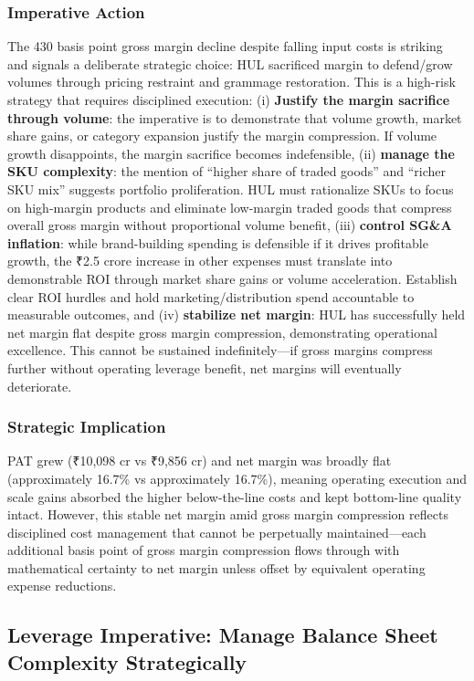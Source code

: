 \documentclass[12pt, a4paper]{report}
\begin{document}
\subsubsection{Imperative Action}
The 430 basis point gross margin decline despite falling input costs is striking and signals a deliberate strategic choice: HUL sacrificed margin to defend/grow volumes through pricing restraint and grammage restoration. This is a high-risk strategy that requires disciplined execution: (i) \textbf{Justify the margin sacrifice through volume}: the imperative is to demonstrate that volume growth, market share gains, or category expansion justify the margin compression. If volume growth disappoints, the margin sacrifice becomes indefensible, (ii) \textbf{manage the SKU complexity}: the mention of ``higher share of traded goods'' and ``richer SKU mix'' suggests portfolio proliferation. HUL must rationalize SKUs to focus on high-margin products and eliminate low-margin traded goods that compress overall gross margin without proportional volume benefit, (iii) \textbf{control SG\&A inflation}: while brand-building spending is defensible if it drives profitable growth, the ₹2.5 crore increase in other expenses must translate into demonstrable ROI through market share gains or volume acceleration. Establish clear ROI hurdles and hold marketing/distribution spend accountable to measurable outcomes, and (iv) \textbf{stabilize net margin}: HUL has successfully held net margin flat despite gross margin compression, demonstrating operational excellence. This cannot be sustained indefinitely—if gross margins compress further without operating leverage benefit, net margins will eventually deteriorate.

\subsubsection{Strategic Implication}
PAT grew (₹10,098 cr vs ₹9,856 cr) and net margin was broadly flat (approximately 16.7\% vs approximately 16.7\%), meaning operating execution and scale gains absorbed the higher below-the-line costs and kept bottom-line quality intact. However, this stable net margin amid gross margin compression reflects disciplined cost management that cannot be perpetually maintained—each additional basis point of gross margin compression flows through with mathematical certainty to net margin unless offset by equivalent operating expense reductions.

\subsection{Leverage Imperative: Manage Balance Sheet Complexity Strategically}
\end{document}
